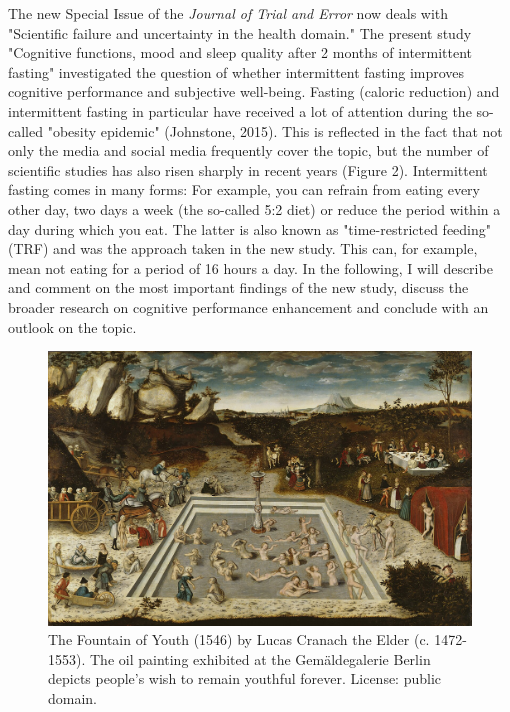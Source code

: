 \documentclass[authordate, reflection,issue]{jote-new-article}
\begin{document}
The new Special Issue of the \emph{Journal of Trial and Error} now deals with "Scientific failure and uncertainty in the health domain." The present study "Cognitive functions, mood and sleep quality after 2 months of intermittent fasting" investigated the question of whether intermittent fasting improves cognitive performance and subjective well-being. Fasting (caloric reduction) and intermittent fasting in particular have received a lot of attention during the so-called "obesity epidemic" (Johnstone, 2015). This is reflected in the fact that not only the media and social media frequently cover the topic, but the number of scientific studies has also risen sharply in recent years (Figure 2). Intermittent fasting comes in many forms: For example, you can refrain from eating every other day, two days a week (the so-called 5:2 diet) or reduce the period within a day during which you eat. The latter is also known as "time-restricted feeding" (TRF) and was the approach taken in the new study. This can, for example, mean not eating for a period of 16 hours a day. In the following, I will describe and comment on the most important findings of the new study, discuss the broader research on cognitive performance enhancement and conclude with an outlook on the topic.





\begin{figure}[t]
  \begin{fullwidth}
    \includegraphics[width=\linewidth]{media/image1.jpg}
    \caption{The Fountain of Youth (1546) by Lucas Cranach the Elder (c. 1472-1553). The oil painting exhibited at the Gemäldegalerie Berlin depicts people's wish to remain youthful forever. License: public domain.}
    \label{fig:fountain}


  \end{fullwidth}

\end{figure}
\end{document}
